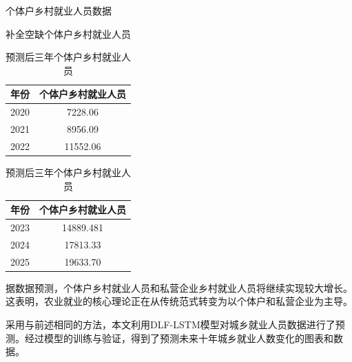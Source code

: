 \begin{table}[H]
\caption{个体户乡村就业人员数据}
\begin{subtable}{0.5\textwidth}
  \centering
  \caption{补全空缺个体户乡村就业人员}
  \begin{tabular}{cc}
    \hline
    \hline
    \textbf{年份} & \textbf{个体户乡村就业人员}\\
    \hline
    2020 & 7228.06\\
    2021 & 8956.09\\
    2022 & 11552.06\\
    \hline
  \end{tabular}
\end{subtable}%
\begin{subtable}{0.5\textwidth}
  \centering
  \caption{预测后三年个体户乡村就业人员}
  \begin{tabular}{cc}
    \hline
    \hline
    \textbf{年份} & \textbf{个体户乡村就业人员}\\
    \hline
    2023 & 14889.481\\
    2024 & 17813.33\\
    2025 & 19633.70\\
    \hline
  \end{tabular}
\end{subtable}

\end{table}

据数据预测，个体户乡村就业人员和私营企业乡村就业人员将继续实现较大增长。这表明，农业就业的核心理论正在从传统范式转变为以个体户和私营企业为主导。

采用与前述相同的方法，本文利用DLF-LSTM模型对城乡就业人员数据进行了预测。经过模型的训练与验证，得到了预测未来十年城乡就业人数变化的图表和数据。

